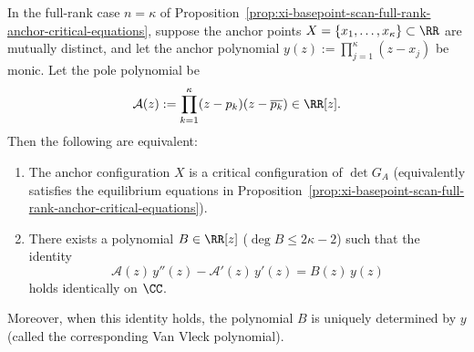 \begin{proposition}\label{prop:xi-basepoint-scan-heine-stieltjes-ode}
In the full-rank case \(n=\kappa\) of Proposition~\ref{prop:xi-basepoint-scan-full-rank-anchor-critical-equations}, suppose the anchor points \(X=\{x_1,\dots,x_\kappa\}\subset\RR\) are mutually distinct, and let the anchor polynomial
\(
y(z):=\prod_{j=1}^{\kappa}(z-x_j)
\)
be monic.
Let the pole polynomial be
\[
\mathcal{A}(z):=\prod_{k=1}^{\kappa}(z-p_k)(z-\overline{p_k})\in\RR[z].
\]
Then the following are equivalent:
\begin{enumerate}
\item The anchor configuration \(X\) is a critical configuration of \(\det G_A\) (equivalently satisfies the equilibrium equations in Proposition~\ref{prop:xi-basepoint-scan-full-rank-anchor-critical-equations}).
\item There exists a polynomial \(B\in\RR[z]\) (\(\deg B\le 2\kappa-2\)) such that the identity
\[
\boxed{\;
\mathcal{A}(z)\,y''(z)-\mathcal{A}'(z)\,y'(z)=B(z)\,y(z)\;}
\]
holds identically on \(\CC\).
\end{enumerate}
Moreover, when this identity holds, the polynomial \(B\) is uniquely determined by \(y\) (called the corresponding Van Vleck polynomial).
\end{proposition}
